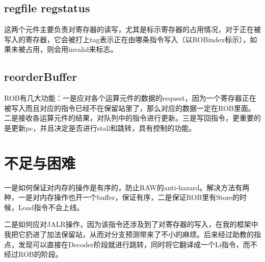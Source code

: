 \documentclass{article}
\begin{document}
\subsection{regfile regstatus}
这两个元件主要负责对寄存器的读写，尤其是标示寄存器的占用情况，对于正在被写入的寄存器，它会被打上tag表示正在由哪条指令写入（以ROBindex标示），如果未被占用，则会用invalid来标志。

\subsection{reorderBuffer}
ROB有几大功能：一是应对各个运算元件的数据的request，因为一个寄存器正在被写入而且对应的指令已经不在保留站里了，那么对应的数据一定在ROB里面。二是接收各运算元件的结果，对队列中的指令进行更新。三是写回指令，更重要的是更新pc，并且决定是否进行stall和跳转，具有控制的功能。
\section{不足与困难}
	一是如何保证对内存的操作是有序的，防止RAW的anti-hazard。解决方法有两种，一是对内存操作也开一个buffer，保证有序，二是保证ROB里有Store的时候，Load指令不会上线。
	
	二是如何应对JALR操作，因为该指令还涉及到了对寄存器的写入，在我的框架中我把它扔进了加法保留站，从而对分支预测带来了不小的麻烦。后来经过助教的指点，发现可以直接在Decoder阶段就进行跳转，同时将它翻译成一个Li指令，而不经过ROB的阶段。
\end{document}

